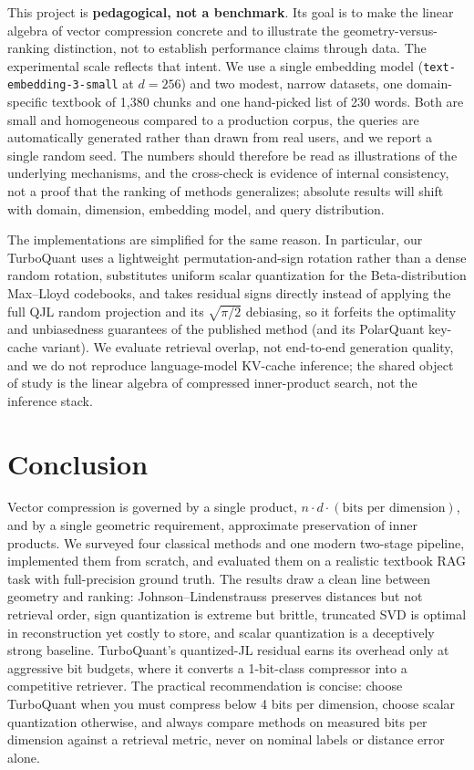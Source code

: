 \documentclass[11pt]{article}
\begin{document}
This project is \textbf{pedagogical, not a benchmark}. Its goal is to make the linear algebra of vector compression concrete and to illustrate the geometry-versus-ranking distinction, not to establish performance claims through data. The experimental scale reflects that intent. We use a single embedding model (\texttt{text-embedding-3-small} at $d = 256$) and two modest, narrow datasets, one domain-specific textbook of 1{,}380 chunks and one hand-picked list of 230 words. Both are small and homogeneous compared to a production corpus, the queries are automatically generated rather than drawn from real users, and we report a single random seed. The numbers should therefore be read as illustrations of the underlying mechanisms, and the cross-check is evidence of internal consistency, not a proof that the ranking of methods generalizes; absolute results will shift with domain, dimension, embedding model, and query distribution.

The implementations are simplified for the same reason. In particular, our TurboQuant uses a lightweight permutation-and-sign rotation rather than a dense random rotation, substitutes uniform scalar quantization for the Beta-distribution Max--Lloyd codebooks, and takes residual signs directly instead of applying the full QJL random projection and its $\sqrt{\pi/2}$ debiasing, so it forfeits the optimality and unbiasedness guarantees of the published method (and its PolarQuant key-cache variant). We evaluate retrieval overlap, not end-to-end generation quality, and we do not reproduce language-model KV-cache inference; the shared object of study is the linear algebra of compressed inner-product search, not the inference stack.

\section{Conclusion}

Vector compression is governed by a single product, $n \cdot d \cdot (\text{bits per dimension})$, and by a single geometric requirement, approximate preservation of inner products. We surveyed four classical methods and one modern two-stage pipeline, implemented them from scratch, and evaluated them on a realistic textbook RAG task with full-precision ground truth. The results draw a clean line between geometry and ranking: Johnson--Lindenstrauss preserves distances but not retrieval order, sign quantization is extreme but brittle, truncated SVD is optimal in reconstruction yet costly to store, and scalar quantization is a deceptively strong baseline. TurboQuant's quantized-JL residual earns its overhead only at aggressive bit budgets, where it converts a 1-bit-class compressor into a competitive retriever. The practical recommendation is concise: choose TurboQuant when you must compress below 4 bits per dimension, choose scalar quantization otherwise, and always compare methods on measured bits per dimension against a retrieval metric, never on nominal labels or distance error alone.
\end{document}
